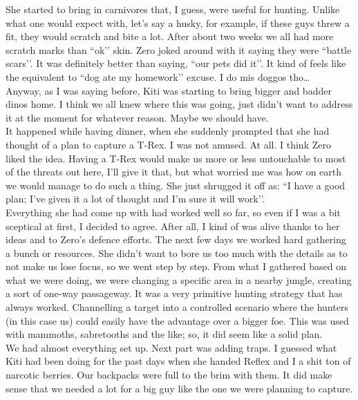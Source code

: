 \documentclass[a4paper,onecolumn,11pt]{article}
\begin{document}
\newline
She started to bring in carnivores that, I guess, were useful for hunting. Unlike what one would expect with, let’s say a husky, for example, if these guys threw a fit, they would scratch and bite a lot. After about two weeks we all had more scratch marks than ``ok’’ skin. Zero joked around with it saying they were ``battle scars’’. It was definitely better than saying, ``our pets did it’’. It kind of feels like the equivalent to ``dog ate my homework’’ excuse. I do mis doggos tho\ldots \\
\newline
Anyway, as I was saying before, Kiti was starting to bring bigger and badder dinos home. I think we all knew where this was going, just didn’t want to address it at the moment for whatever reason. Maybe we should have. \\
\newline
It happened while having dinner, when she suddenly prompted that she had thought of a plan to capture a T-Rex. I was not amused. At all. I think Zero liked the idea. Having a T-Rex would make us more or less untouchable to most of the threats out here, I’ll give it that, but what worried me was how on earth we would manage to do such a thing. She just shrugged it off as: ``I have a good plan; I’ve given it a lot of thought and I’m sure it will work’’.\\
\newline
Everything she had come up with had worked well so far, so even if I was a bit sceptical at first, I decided to agree. After all, I kind of was alive thanks to her ideas and to Zero’s defence efforts.
The next few days we worked hard gathering a bunch or resources. She didn’t want to bore us too much with the details as to not make us lose focus, so we went step by step. From what I gathered based on what we were doing, we were changing a specific area in a nearby jungle, creating a sort of one-way passageway. It was a very primitive hunting strategy that has always worked. Channelling a target into a controlled scenario where the hunters (in this case us) could easily have the advantage over a bigger foe. This was used with mammoths, sabretooths and the like; so, it did seem like a solid plan.\\
\newline
We had almost everything set up. Next part was adding traps. I guessed what Kiti had been doing for the past days when she handed Reflex and I a shit ton of narcotic berries. Our backpacks were full to the brim with them. It did make sense that we needed a lot for a big guy like the one we were planning to capture.\\
\end{document}
